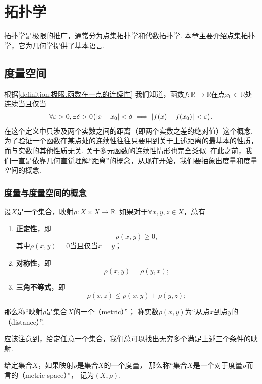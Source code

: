\chapter{拓扑学}
拓扑学是极限的推广，通常分为点集拓扑学和代数拓扑学.
本章主要介绍点集拓扑学，它为几何学提供了基本语言.

\section{度量空间}
根据\cref{definition:极限.函数在一点的连续性} 我们知道，函数\(f\colon\mathbb{R}\to\mathbb{R}\)在点\(x_0\in\mathbb{R}\)处连续当且仅当\[
\forall\varepsilon>0,
\exists\delta>0
\bigl(
\abs{x - x_0}<\delta
\implies
\abs{f(x) - f(x_0)} < \varepsilon
\bigr).
\]
在这个定义中只涉及两个实数之间的距离（即两个实数之差的绝对值）这个概念.
为了验证一个函数在某点处的连续性往往只要用到关于上述距离的最基本的性质，而与实数的其他性质无关.
关于多元函数的连续性情形也完全类似.
在此之前，我们一直是依靠几何直觉理解“距离”的概念，从现在开始，我们要抽象出度量和度量空间的概念.

\subsection{度量与度量空间的概念}
\begin{definition}
设\(X\)是一个集合，映射\(\rho\colon X \times X\to\mathbb{R}\).
如果对于\(\forall x,y,z \in X\)，总有\begin{enumerate}
\item {\bf 正定性}，即\[
\rho(x,y)\geq0,
\]其中\(\rho(x,y)=0\)当且仅当\(x=y\)；

\item {\bf 对称性}，即\[
\rho(x,y) = \rho(y,x);
\]

\item {\bf 三角不等式}，即\[
\rho(x,z) \leq \rho(x,y) + \rho(y,z);
\]
\end{enumerate}
那么称“映射\(\rho\)是集合\(X\)的一个（metric）”；
称实数\(\rho(x,y)\)为“从点\(x\)到点\(y\)的（distance）”.
\end{definition}

应该注意到，给定任意一个集合，我们总可以找出无穷多个满足上述三个条件的映射.

\begin{definition}
给定集合\(X\)，如果映射\(\rho\)是集合\(X\)的一个度量，
那么称“集合\(X\)是一个对于度量\(\rho\)而言的（metric space）”，
记为\((X,\rho)\).
\end{definition}

